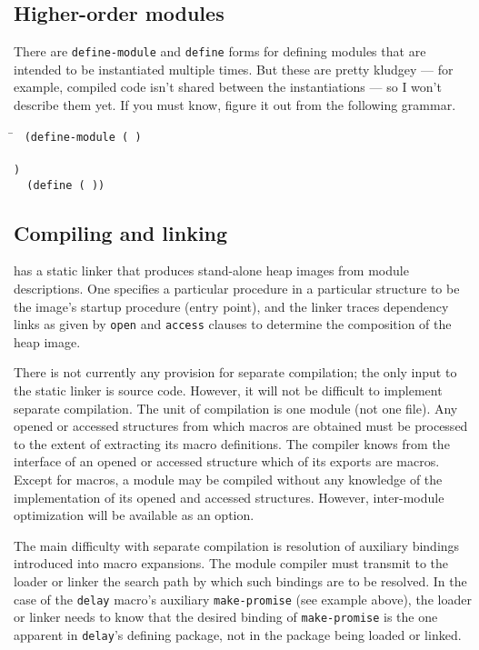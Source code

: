 \subsection*{Higher-order modules}

There are {\tt define-module} and {\tt define} forms for
defining modules that are intended to be instantiated multiple times.
But these are pretty kludgey --- for example, compiled code isn't
shared between the instantiations --- so I won't describe them yet.
If you must know, figure it out from the following grammar.
\begin{tabbing}
\qquad
    \=\goesto{}~
      \tt(d\=\tt{}efine-module ( ) \\
       \>  \> \\
       \>  \>\tt) \\
        \>\altz{}~ \tt(define 
                        ( ))
\end{tabbing}


\subsection*{Compiling and linking}

\hack{} has a static linker that produces stand-alone heap images
from module descriptions.  One specifies a particular procedure in a
particular structure to be the image's startup procedure (entry
point), and the linker traces dependency links as given by {\tt open}
and {\tt access} clauses to determine the composition of the heap
image.

There is not currently any provision for separate compilation; the
only input to the static linker is source code.  However, it will not
be difficult to implement separate compilation.  The unit of
compilation is one module (not one file).  Any opened or accessed
structures from which macros are obtained must be processed to the
extent of extracting its macro definitions.  The compiler knows from
the interface of an opened or accessed structure which of its exports
are macros.  Except for macros, a module may be compiled without any
knowledge of the implementation of its opened and accessed structures.
However, inter-module optimization will be available as an option.

The main difficulty with separate compilation is resolution of
auxiliary bindings introduced into macro expansions.  The module
compiler must transmit to the loader or linker the search path by
which such bindings are to be resolved.  In the case of the {\tt delay}
macro's auxiliary {\tt make-promise} (see example above), the loader
or linker needs to know that the desired binding of {\tt make-promise}
is the one apparent in {\tt delay}'s defining package, not in the
package being loaded or linked.

